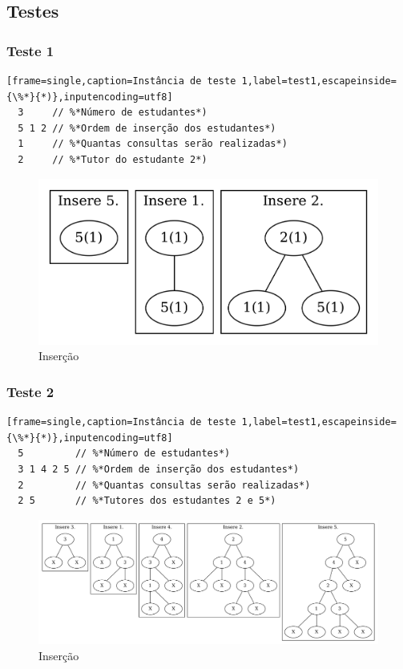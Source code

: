 \subsection{Testes}\label{sec:testes}
\subsubsection{Teste 1}
\begin{lstlisting}[frame=single,caption=Instância de teste 1,label=test1,escapeinside={\%*}{*)},inputencoding=utf8]
  3     // %*Número de estudantes*)
  5 1 2 // %*Ordem de inserção dos estudantes*)
  1     // %*Quantas consultas serão realizadas*)
  2     // %*Tutor do estudante 2*)
\end{lstlisting}

\begin{figure}[htb]
  \centering
  \includegraphics[width=0.5\linewidth]{test1.png}
  \caption{Inserção}
  \label{fig:test1}
\end{figure}

\subsubsection{Teste 2}
\begin{lstlisting}[frame=single,caption=Instância de teste 1,label=test1,escapeinside={\%*}{*)},inputencoding=utf8]
  5         // %*Número de estudantes*)
  3 1 4 2 5 // %*Ordem de inserção dos estudantes*)
  2         // %*Quantas consultas serão realizadas*)
  2 5       // %*Tutores dos estudantes 2 e 5*)
\end{lstlisting}

\begin{figure}[htb]
  \centering
  \includegraphics[width=\linewidth]{test2.png}
  \caption{Inserção}
  \label{fig:test1}
\end{figure}